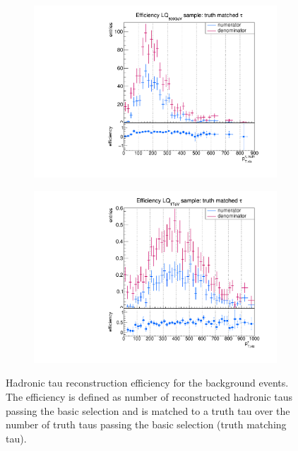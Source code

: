 %
\begin{figure}
  \centering
                \begin{subfigure}[t]{0.49\textwidth}
                \includegraphics[width=\textwidth]{figures/plots/LQ75/Divided_Tau.pdf}
                \label{DividedTau:signal:LQ75}
                \end{subfigure}
                \begin{subfigure}[t]{0.49\textwidth}
                \includegraphics[width=\textwidth]{figures/plots/LQ76/Divided_Tau.pdf}
                \label{DividedTau:signal:LQ76}
                \end{subfigure}
\caption[Hadronic tau reconstruction efficiency for the background events.]{Hadronic tau reconstruction efficiency for the background events. The efficiency is defined as number of reconstructed hadronic taus passing the basic selection and is matched to a truth tau over the number of truth taus passing the basic selection (truth matching tau).}
\label{DividedTau:signal}
\end{figure}
